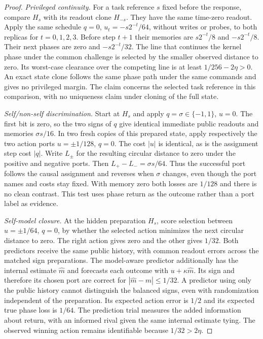 \documentclass[11pt,a4paper]{article}
\theoremstyle{definition}
\begin{document}
\begin{proof}
\emph{Privileged continuity.} For a task reference $s$ fixed before the response, compare $H_s$ with its readout clone $H_{-s}$. They have the same time-zero readout. Apply the same schedule $q=0$, $u_t=-s2^{-t}/64$, without writes or probes, to both replicas for $t=0,1,2,3$. Before step $t+1$ their memories are $s2^{-t}/8$ and $-s2^{-t}/8$. Their next phases are zero and $-s2^{-t}/32$. The line that continues the kernel phase under the common challenge is selected by the smaller observed distance to zero. Its worst-case clearance over the competing line is at least $1/256-2\eta>0$. An exact state clone follows the same phase path under the same commands and gives no privileged margin. The claim concerns the selected task reference in this comparison, with no uniqueness claim under cloning of the full state.

\emph{Self/non-self discrimination.} Start at $H_s$ and apply $q=\sigma\in\{-1,1\}$, $u=0$. The first bit is zero, so the two signs of $q$ give identical immediate public readouts and memories $\sigma s/16$. In two fresh copies of this prepared state, apply respectively the two action ports $u=\pm1/128$, $q=0$. The cost $|u|$ is identical, as is the assignment step cost $|q|$. Write $L_\pm$ for the resulting circular distance to zero under the positive and negative ports. Then $L_+-L_-=\sigma s/64$. Thus the successful port follows the causal assignment and reverses when $\sigma$ changes, even though the port names and costs stay fixed. With memory zero both losses are $1/128$ and there is no clean contrast. This test uses phase return as the outcome rather than a port label as evidence.

\emph{Self-model closure.} At the hidden preparation $H_s$, score selection between $u=\pm1/64$, $q=0$, by whether the selected action minimizes the next circular distance to zero. The right action gives zero and the other gives $1/32$. Both predictors receive the same public history, with common readout errors across the matched sign preparations. The model-aware predictor additionally has the internal estimate $\widehat m$ and forecasts each outcome with $u+\kappa\widehat m$. Its sign and therefore its chosen port are correct for $|\widehat m-m|\le1/32$. A predictor using only the public history cannot distinguish the balanced signs, even with randomization independent of the preparation. Its expected action error is $1/2$ and its expected true phase loss is $1/64$. The prediction trial measures the added information about return, with an informed rival given the same internal estimate tying. The observed winning action remains identifiable because $1/32>2\eta$.


\end{proof}
\end{document}
